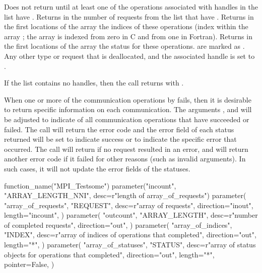 Does not return until
at least one of the operations associated with 
handles in the list have .
Returns in  the number of requests from the list
 that have .  Returns in the first
 locations of the array 
the indices of these operations (index within the
array ; the array is indexed from zero in
C and from one in
Fortran).  Returns in the first 
locations of the array 
the status for these  operations.
   are marked as .  Any other
type or request that 
is deallocated, and the
associated handle is set to .

If the list contains no  handles, then the
call returns  with \mpicode{ = }.

When one or more of the communication operations  by
 fails, then it is desirable to return specific
information on each communication.
The arguments ,
 and  will be
adjusted to indicate  of all communication operations that have
succeeded or failed.  The call will return the error code
 and the error field of each status
returned will be set to indicate success or to indicate the specific error
that occurred.  The call will return  if no request
resulted in an error,
and will return another error code if it failed
for other reasons (such as invalid arguments).  In such cases, it will
not update the error fields of the statuses.

\begin{mpi-binding}
    function_name("MPI_Testsome")
    parameter("incount", "ARRAY_LENGTH_NNI", desc=r"length of array_of_requests")
    parameter(
        "array_of_requests",
        "REQUEST",
        desc=r"array of requests",
        direction="inout",
        length="incount",
    )
    parameter(
        "outcount",
        "ARRAY_LENGTH",
        desc=r"number of completed requests",
        direction="out",
    )
    parameter(
        "array_of_indices",
        "INDEX",
        desc=r"array of indices of operations that completed",
        direction="out",
        length="*",
    )
    parameter(
        "array_of_statuses",
        "STATUS",
        desc=r"array of status objects for operations that completed",
        direction="out",
        length="*",
        pointer=False,
    )
\end{mpi-binding}

